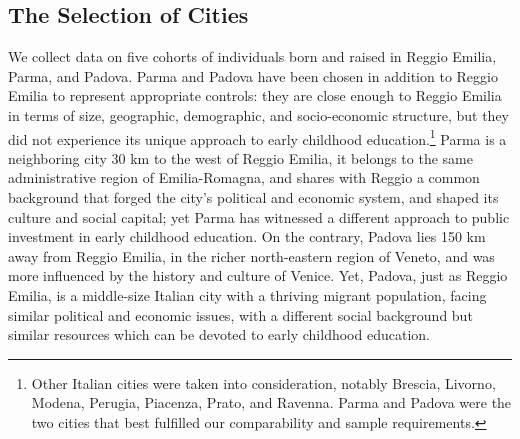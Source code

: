 \subsection{The Selection of Cities}

We collect data on five cohorts of individuals born and raised in Reggio Emilia, Parma, and Padova. Parma and Padova have been chosen in addition to Reggio Emilia to represent appropriate controls: they are close enough to Reggio Emilia in terms of size, geographic, demographic, and socio-economic structure, but they did not experience its unique approach to early childhood education.\footnote{Other Italian cities were taken into consideration, notably Brescia, Livorno, Modena, Perugia, Piacenza, Prato, and Ravenna. Parma and Padova were the two cities that best fulfilled our comparability and sample requirements.} Parma is a neighboring city 30 km to the west of Reggio Emilia, it belongs to the same administrative region of Emilia-Romagna, and shares with Reggio a common background that forged the city's political and economic system, and shaped its culture and social capital; yet Parma has witnessed a different approach to public investment in early childhood education. On the contrary, Padova lies 150 km away from Reggio Emilia, in the richer north-eastern region of Veneto, and was more influenced by the history and culture of Venice. Yet, Padova, just as Reggio Emilia, is a middle-size Italian city with a thriving migrant population, facing similar political and economic issues, with a different social background but similar resources which can be devoted to early childhood education.

